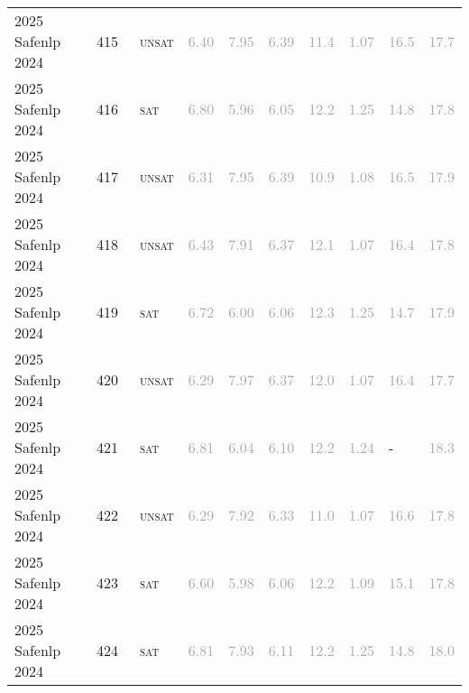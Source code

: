 \begin{center}
{\begin{longtable}{@{}llllllllll@{}}
2025 Safenlp 2024 & 415 & ~\textsc{unsat} & \textcolor{darkgray}{6.40} & \textcolor{darkgray}{7.95} & \textcolor{darkgray}{6.39} & \textcolor{darkgray}{11.4} & \textcolor{darkgray}{1.07} & \textcolor{darkgray}{16.5} & \textcolor{darkgray}{17.7} \\
2025 Safenlp 2024 & 416 & ~\textsc{sat} & \textcolor{darkgray}{6.80} & \textcolor{darkgray}{5.96} & \textcolor{darkgray}{6.05} & \textcolor{darkgray}{12.2} & \textcolor{darkgray}{1.25} & \textcolor{darkgray}{14.8} & \textcolor{darkgray}{17.8} \\
2025 Safenlp 2024 & 417 & ~\textsc{unsat} & \textcolor{darkgray}{6.31} & \textcolor{darkgray}{7.95} & \textcolor{darkgray}{6.39} & \textcolor{darkgray}{10.9} & \textcolor{darkgray}{1.08} & \textcolor{darkgray}{16.5} & \textcolor{darkgray}{17.9} \\
2025 Safenlp 2024 & 418 & ~\textsc{unsat} & \textcolor{darkgray}{6.43} & \textcolor{darkgray}{7.91} & \textcolor{darkgray}{6.37} & \textcolor{darkgray}{12.1} & \textcolor{darkgray}{1.07} & \textcolor{darkgray}{16.4} & \textcolor{darkgray}{17.8} \\
2025 Safenlp 2024 & 419 & ~\textsc{sat} & \textcolor{darkgray}{6.72} & \textcolor{darkgray}{6.00} & \textcolor{darkgray}{6.06} & \textcolor{darkgray}{12.3} & \textcolor{darkgray}{1.25} & \textcolor{darkgray}{14.7} & \textcolor{darkgray}{17.9} \\
2025 Safenlp 2024 & 420 & ~\textsc{unsat} & \textcolor{darkgray}{6.29} & \textcolor{darkgray}{7.97} & \textcolor{darkgray}{6.37} & \textcolor{darkgray}{12.0} & \textcolor{darkgray}{1.07} & \textcolor{darkgray}{16.4} & \textcolor{darkgray}{17.7} \\
2025 Safenlp 2024 & 421 & ~\textsc{sat} & \textcolor{darkgray}{6.81} & \textcolor{darkgray}{6.04} & \textcolor{darkgray}{6.10} & \textcolor{darkgray}{12.2} & \textcolor{darkgray}{1.24} & - & \textcolor{darkgray}{18.3} \\
2025 Safenlp 2024 & 422 & ~\textsc{unsat} & \textcolor{darkgray}{6.29} & \textcolor{darkgray}{7.92} & \textcolor{darkgray}{6.33} & \textcolor{darkgray}{11.0} & \textcolor{darkgray}{1.07} & \textcolor{darkgray}{16.6} & \textcolor{darkgray}{17.8} \\
2025 Safenlp 2024 & 423 & ~\textsc{sat} & \textcolor{darkgray}{6.60} & \textcolor{darkgray}{5.98} & \textcolor{darkgray}{6.06} & \textcolor{darkgray}{12.2} & \textcolor{darkgray}{1.09} & \textcolor{darkgray}{15.1} & \textcolor{darkgray}{17.8} \\
2025 Safenlp 2024 & 424 & ~\textsc{sat} & \textcolor{darkgray}{6.81} & \textcolor{darkgray}{7.93} & \textcolor{darkgray}{6.11} & \textcolor{darkgray}{12.2} & \textcolor{darkgray}{1.25} & \textcolor{darkgray}{14.8} & \textcolor{darkgray}{18.0} \\

\end{longtable}}
\end{center}
